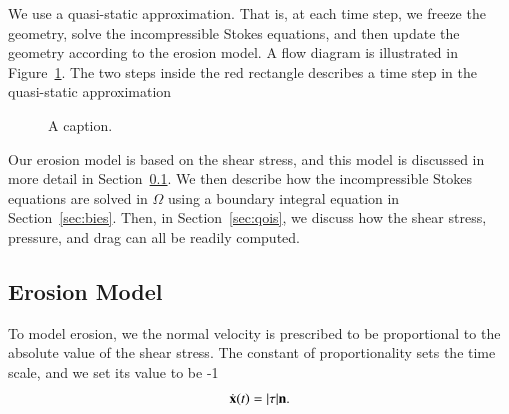 \documentclass[preprint, 10pt]{elsarticle}
\begin{document}
We use a quasi-static approximation.  That is, at each time step, we
freeze the geometry, solve the incompressible Stokes equations, and then
update the geometry according to the erosion model.  A flow diagram is
illustrated in Figure~\ref{fig:workflow}.  The two steps inside the red
rectangle describes a time step in the quasi-static approximation
\begin{figure}[htpb]
  \centering
  
  \caption{\label{fig:workflow}A caption.}
\end{figure}

Our erosion model is based on the shear stress, and this model is
discussed in more detail in Section~\ref{sec:erosion}.  We then describe
how the incompressible Stokes equations are solved in $\Omega$ using a
boundary integral equation in Section~\ref{sec:bies}.  Then, in
Section~\ref{sec:qois}, we discuss how the shear stress, pressure, and
drag can all be readily computed.  


\subsection{Erosion Model} 
\label{sec:erosion}

To model erosion, we the normal velocity is prescribed to be
proportional to the absolute value of the shear stress.  The constant of
proportionality sets the time scale, and we set its value to be -1
\begin{align}
  \dot{{\mathbf{x}}}(t) = \lvert \tau \rvert {\mathbf{n}}.
  \label{eqn:bodyEvolution}
\end{align}

\cite{moo-ris-chi-zha-she2013}


\end{document}
